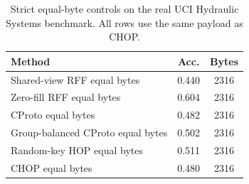 \begin{table}[t]
\centering
\caption{Strict equal-byte controls on the real UCI Hydraulic Systems benchmark. All rows use the same payload as CHOP.}
\label{tab:strict-equal-byte-hydraulic}
\begin{tabular}{lcc}
\toprule
Method & Acc. & Bytes \\
\midrule
Shared-view RFF equal bytes & 0.440 & 2316 \\
Zero-fill RFF equal bytes & 0.604 & 2316 \\
CProto equal bytes & 0.482 & 2316 \\
Group-balanced CProto equal bytes & 0.502 & 2316 \\
Random-key HOP equal bytes & 0.511 & 2316 \\
CHOP equal bytes & 0.480 & 2316 \\
\bottomrule
\end{tabular}
\end{table}
